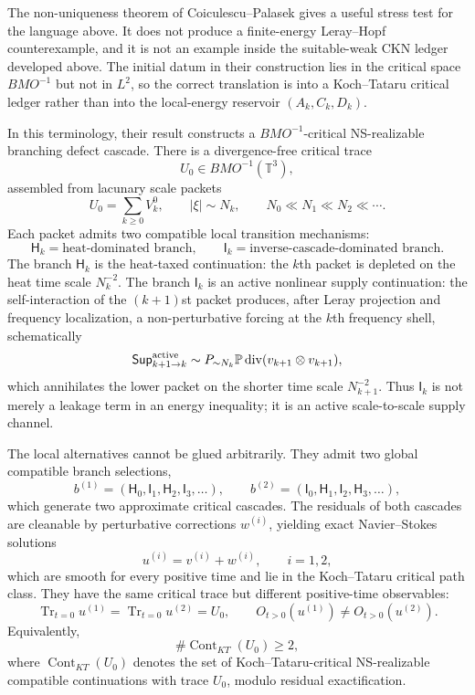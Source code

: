 \documentclass[11pt]{article}
\numberwithin{equation}{section}
\newcommand{\Supp}{\mathsf{Sup}}
\begin{document}
The non-uniqueness theorem of Coiculescu--Palasek \cite{CoiculescuPalasek2025} gives a useful stress test for the language above.  It does not produce a finite-energy Leray--Hopf counterexample, and it is not an example inside the suitable-weak CKN ledger developed above.  The initial datum in their construction lies in the critical space $BMO^{-1}$ but not in $L^2$, so the correct translation is into a Koch--Tataru critical ledger \cite{KochTataru2001} rather than into the local-energy reservoir $(A_k,C_k,D_k)$.

In this terminology, their result constructs a $BMO^{-1}$-critical NS-realizable branching defect cascade.  There is a divergence-free critical trace
\[
    U_0\in BMO^{-1}(\mathbb T^3),
\]
assembled from lacunary scale packets
\[
    U_0=\sum_{k\ge0}V_k^0,
    \qquad |\xi|\sim N_k,
    \qquad N_0\ll N_1\ll N_2\ll\cdots .
\]
Each packet admits two compatible local transition mechanisms:
\[
    \mathsf H_k=\text{heat-dominated branch},
    \qquad
    \mathsf I_k=\text{inverse-cascade-dominated branch}.
\]
The branch $\mathsf H_k$ is the heat-taxed continuation: the $k$th packet is depleted on the heat time scale $N_k^{-2}$.  The branch $\mathsf I_k$ is an active nonlinear supply continuation: the self-interaction of the $(k+1)$st packet produces, after Leray projection and frequency localization, a non-perturbative forcing at the $k$th frequency shell, schematically
\[
    \Supp^{\rm active}_{k+1\to k}
    \sim
    P_{\sim N_k}\mathbb P\operatorname{div}(v_{k+1}\otimes v_{k+1}),
\]
which annihilates the lower packet on the shorter time scale $N_{k+1}^{-2}$.  Thus $\mathsf I_k$ is not merely a leakage term in an energy inequality; it is an active scale-to-scale supply channel.

The local alternatives cannot be glued arbitrarily.  They admit two global compatible branch selections,
\[
    b^{(1)}=(\mathsf H_0,\mathsf I_1,\mathsf H_2,\mathsf I_3,\ldots),
    \qquad
    b^{(2)}=(\mathsf I_0,\mathsf H_1,\mathsf I_2,\mathsf H_3,\ldots),
\]
which generate two approximate critical cascades.  The residuals of both cascades are cleanable by perturbative corrections $w^{(i)}$, yielding exact Navier--Stokes solutions
\[
    u^{(i)}=v^{(i)}+w^{(i)},
    \qquad i=1,2,
\]
which are smooth for every positive time and lie in the Koch--Tataru critical path class.  They have the same critical trace but different positive-time observables:
\[
    \operatorname{Tr}_{t=0}u^{(1)}
    =
    \operatorname{Tr}_{t=0}u^{(2)}
    =U_0,
    \qquad
    O_{t>0}(u^{(1)})\ne O_{t>0}(u^{(2)}).
\]
Equivalently,
\[
    \#\operatorname{Cont}_{KT}(U_0)\ge2,
\]
where $\operatorname{Cont}_{KT}(U_0)$ denotes the set of Koch--Tataru-critical NS-realizable compatible continuations with trace $U_0$, modulo residual exactification.
\end{document}
